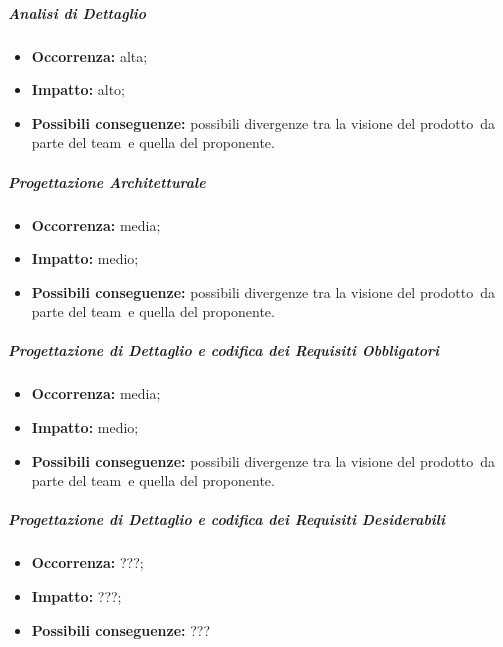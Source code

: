 \documentclass[../PianoProgetto.tex]{subfiles}
\begin{document}
		\subparagraph*{Analisi di Dettaglio}
			\begin{itemize}[label={-}]
				\item \textbf{Occorrenza:} alta;
				\item \textbf{Impatto:} alto;
				\item \textbf{Possibili conseguenze:} possibili divergenze tra la visione del prodotto\g\ da parte del team\g\ e quella del proponente.
			\end{itemize}
			
		\subparagraph*{Progettazione Architetturale}
			\begin{itemize}[label={-}]
				\item \textbf{Occorrenza:} media;
				\item \textbf{Impatto:} medio;
				\item \textbf{Possibili conseguenze:} possibili divergenze tra la visione del prodotto\g\ da parte del team\g\ e quella del proponente.
			\end{itemize}
			
		\subparagraph*{Progettazione di Dettaglio e codifica dei Requisiti Obbligatori}
			\begin{itemize}[label={-}]
				\item \textbf{Occorrenza:} media;
				\item \textbf{Impatto:} medio;
				\item \textbf{Possibili conseguenze:} possibili divergenze tra la visione del prodotto\g\ da parte del team\g\ e quella del proponente.
			\end{itemize}
			
		\subparagraph*{Progettazione di Dettaglio e codifica dei Requisiti Desiderabili}
			\begin{itemize}[label={-}]
				\item \textbf{Occorrenza:} ???;
				\item \textbf{Impatto:} ???;
				\item \textbf{Possibili conseguenze:} ???
			\end{itemize}
			
		
\end{document}
